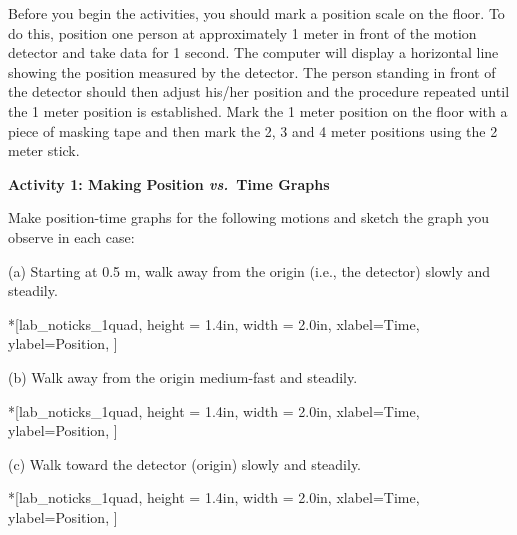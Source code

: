 Before you begin the activities, you should mark a position scale on the floor.
To do this, position one person at approximately 1 meter in front of the motion
detector and take data for 1 second. The computer will display a horizontal
line showing the position measured by the detector. The person standing in front
of the detector should then adjust his/her position and the procedure repeated
until the 1 meter position is established. Mark the 1 meter position on the
floor with a piece of masking tape and then mark the 2, 3 and 4 meter positions
using the 2 meter stick.

\textbf{Activity 1: Making Position \textit{vs.}~Time Graphs }

Make position-time graphs for the following motions and sketch the graph you
observe in each case:

(a) Starting at 0.5 m, walk away from the origin (i.e., the detector) slowly
and steadily.

\begin{lab_axis}*[lab_noticks_1quad,
	height = {1.4in}, width = {2.0in},
	xlabel={Time},
	ylabel={Position},
	]
\end{lab_axis}

(b) Walk away from the origin medium-fast and steadily.

\begin{lab_axis}*[lab_noticks_1quad,
	height = {1.4in}, width = {2.0in},
	xlabel={Time},
	ylabel={Position},
	]
\end{lab_axis}

(c) Walk toward the detector (origin) slowly and steadily.

\begin{lab_axis}*[lab_noticks_1quad,
	height = {1.4in}, width = {2.0in},
	xlabel={Time},
	ylabel={Position},
	]
\end{lab_axis}

